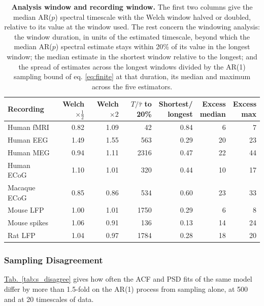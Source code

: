 \documentclass[pdflatex,lineno,sn-nature]{sn-jnl}
\newcommand{\tabpanel}[2][]{\hyperref[#2]{Tab.~#1\ref*{#2}}}
\theoremstyle{thmstyleone}
\theoremstyle{thmstyletwo}
\theoremstyle{thmstylethree}
\begin{document}
\begin{table}[h]
\caption{\textbf{Analysis window and recording window.} The first two columns give the median AR($p$) spectral timescale with the Welch window halved or doubled, relative to its value at the window used. The rest concern the windowing analysis: the window duration, in units of the estimated timescale, beyond which the median AR($p$) spectral estimate stays within 20\% of its value in the longest window; the median estimate in the shortest window relative to the longest; and the spread of estimates across the longest windows divided by the AR(1) sampling bound of eq. \ref{eq:finite} at that duration, its median and maximum across the five estimators.}\label{tab:s_windows}
\setlength{\tabcolsep}{3pt}
\begin{tabular}{lrrrrrr}
\toprule
Recording & \shortstack[c]{Welch \\ $\times\tfrac12$} & \shortstack[c]{Welch \\ $\times 2$} & \shortstack[c]{$T/\hat\tau$ \\ to 20\%} & \shortstack[c]{Shortest/ \\ longest} & \shortstack[c]{Excess \\ median} & \shortstack[c]{Excess \\ max} \\
\midrule
Human fMRI & 0.82 & 1.09 & 42 & 0.84 & 6 & 7 \\
Human EEG & 1.49 & 1.55 & 563 & 0.29 & 20 & 23 \\
Human MEG & 0.94 & 1.11 & 2316 & 0.47 & 22 & 44 \\
Human ECoG & 1.10 & 1.01 & 320 & 0.44 & 10 & 17 \\
Macaque ECoG & 0.85 & 0.86 & 534 & 0.60 & 23 & 33 \\
Mouse LFP & 1.00 & 1.01 & 1750 & 0.29 & 6 & 8 \\
Mouse spikes & 1.06 & 0.91 & 136 & 0.13 & 14 & 24 \\
Rat LFP & 1.04 & 0.97 & 1784 & 0.28 & 18 & 20 \\
\bottomrule
\end{tabular}
\end{table}

\subsubsection*{Sampling Disagreement}

\tabpanel{tab:s_disagree} gives how often the ACF and PSD fits of the same model differ by more than 1.5-fold on the AR(1) process from sampling alone, at 500 and at 20 timescales of data.
\end{document}
